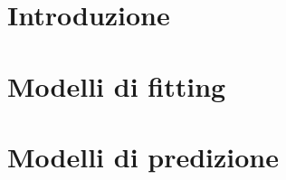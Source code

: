


\maketitle
\clearpage

\tableofcontents
\clearpage

\section{Introduzione}


\section{Modelli di fitting}




\section{Modelli di predizione}



